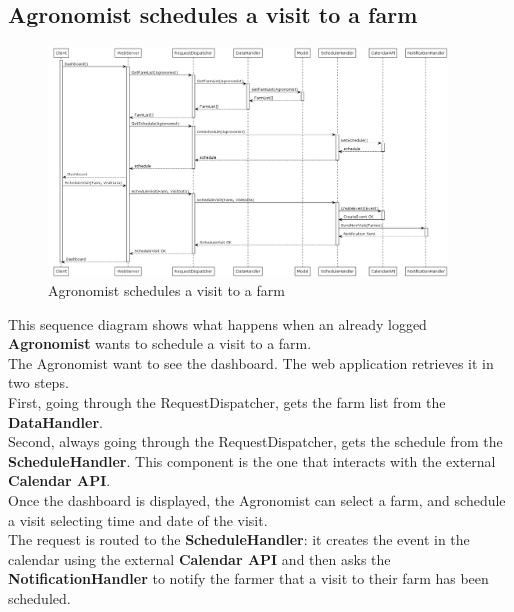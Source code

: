 \documentclass[10pt]{report}
\begin{document}
\subsection{Agronomist schedules a visit to a farm}
\begin{figure}[H]
    \centering
    \includegraphics[width=400px]{SequenceDiagram/Agronomist_2_3.png}
    \caption{Agronomist schedules a visit to a farm}
\end{figure}
This sequence diagram shows what happens when an already logged \textbf{Agronomist} wants to schedule a visit to a farm.\\

The Agronomist want to see the dashboard. The web application retrieves it in two steps.\\ First, going through the RequestDispatcher, gets the farm list from the \textbf{DataHandler}.\\
Second, always going through the RequestDispatcher, gets the schedule from the \textbf{ScheduleHandler}. This component is the one that interacts with the external \textbf{Calendar API}. \\
Once the dashboard is displayed, the Agronomist can select a farm, and schedule a visit selecting time and date of the visit. \\
The request is routed to the \textbf{ScheduleHandler}: it creates the event in the calendar using the external \textbf{Calendar API} and then asks the \textbf{NotificationHandler} to notify the farmer that a visit to their farm has been scheduled.
\end{document}
